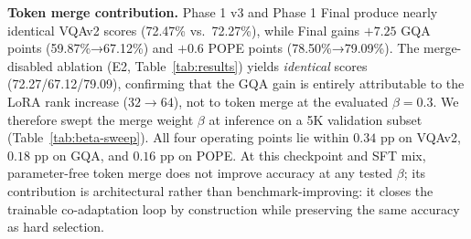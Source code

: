 \documentclass{article}
\begin{document}
\begin{table}[t]
\caption{Ablation study. Val-VQA = NTP cross-entropy (lower is better).
Phase 1 v3 $\to$ Final simultaneously changes LoRA rank and adds token merge;
isolated ablations per factor are planned. Failure modes from training logs.}
\label{tab:ablation}
\label{tab:results}
\vskip 0.1in
\centering
{}
\vskip -0.05in
\end{table}

\textbf{Token merge contribution.}
Phase 1 v3 and Phase 1 Final produce nearly identical VQAv2 scores (72.47\% vs.\ 72.27\%),
while Final gains $+7.25$ GQA points (59.87\%→67.12\%) and $+0.6$ POPE points
(78.50\%→79.09\%).
The merge-disabled ablation (E2, Table~\ref{tab:results}) yields \emph{identical}
scores (72.27/67.12/79.09), confirming that the GQA gain is entirely attributable
to the LoRA rank increase ($32 \to 64$), not to token merge at the evaluated
$\beta{=}0.3$.
We therefore swept the merge weight $\beta$ at inference on a 5K validation
subset (Table~\ref{tab:beta-sweep}). All four operating points lie within
$0.34$ pp on VQAv2, $0.18$ pp on GQA, and $0.16$ pp on POPE. At this checkpoint
and SFT mix, parameter-free token merge does not improve accuracy at any tested
$\beta$; its contribution is architectural rather than benchmark-improving: it
closes the trainable co-adaptation loop by construction while preserving the
same accuracy as hard selection.
\end{document}
